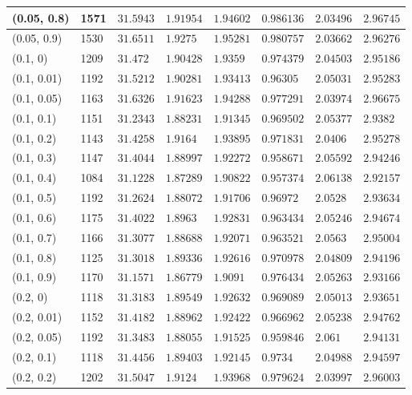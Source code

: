 \begin{center}
{\begin{longtable}{| l | p{} |  p{} | p{} | p{} | p{} | p{} | p{} |}
 (0.05, 0.8) & 1571  & $31.5943$ & $1.91954$ & $1.94602$ & $0.986136$ & $2.03496$ & $2.96745$ \\ \hline
 (0.05, 0.9) & 1530  & $31.6511$ & $1.9275$ & $1.95281$ & $0.980757$ & $2.03662$ & $2.96276$ \\ \hline
 (0.1, 0) & 1209  & $31.472$ & $1.90428$ & $1.9359$ & $0.974379$ & $2.04503$ & $2.95186$ \\ \hline
 (0.1, 0.01) & 1192  & $31.5212$ & $1.90281$ & $1.93413$ & $0.96305$ & $2.05031$ & $2.95283$ \\ \hline
 (0.1, 0.05) & 1163  & $31.6326$ & $1.91623$ & $1.94288$ & $0.977291$ & $2.03974$ & $2.96675$ \\ \hline
 (0.1, 0.1) & 1151  & $31.2343$ & $1.88231$ & $1.91345$ & $0.969502$ & $2.05377$ & $2.9382$ \\ \hline
 (0.1, 0.2) & 1143  & $31.4258$ & $1.9164$ & $1.93895$ & $0.971831$ & $2.0406$ & $2.95278$ \\ \hline
 (0.1, 0.3) & 1147  & $31.4044$ & $1.88997$ & $1.92272$ & $0.958671$ & $2.05592$ & $2.94246$ \\ \hline
 (0.1, 0.4) & 1084  & $31.1228$ & $1.87289$ & $1.90822$ & $0.957374$ & $2.06138$ & $2.92157$ \\ \hline
 (0.1, 0.5) & 1192  & $31.2624$ & $1.88072$ & $1.91706$ & $0.96972$ & $2.0528$ & $2.93634$ \\ \hline
 (0.1, 0.6) & 1175  & $31.4022$ & $1.8963$ & $1.92831$ & $0.963434$ & $2.05246$ & $2.94674$ \\ \hline
 (0.1, 0.7) & 1166  & $31.3077$ & $1.88688$ & $1.92071$ & $0.963521$ & $2.0563$ & $2.95004$ \\ \hline
 (0.1, 0.8) & 1125  & $31.3018$ & $1.89336$ & $1.92616$ & $0.970978$ & $2.04809$ & $2.94196$ \\ \hline
 (0.1, 0.9) & 1170  & $31.1571$ & $1.86779$ & $1.9091$ & $0.976434$ & $2.05263$ & $2.93166$ \\ \hline
 (0.2, 0) & 1118  & $31.3183$ & $1.89549$ & $1.92632$ & $0.969089$ & $2.05013$ & $2.93651$ \\ \hline
 (0.2, 0.01) & 1152  & $31.4182$ & $1.88962$ & $1.92422$ & $0.966962$ & $2.05238$ & $2.94762$ \\ \hline
 (0.2, 0.05) & 1192  & $31.3483$ & $1.88055$ & $1.91525$ & $0.959846$ & $2.061$ & $2.94131$ \\ \hline
 (0.2, 0.1) & 1118  & $31.4456$ & $1.89403$ & $1.92145$ & $0.9734$ & $2.04988$ & $2.94597$ \\ \hline
 (0.2, 0.2) & 1202  & $31.5047$ & $1.9124$ & $1.93968$ & $0.979624$ & $2.03997$ & $2.96003$ \\ \hline

\end{longtable}}
\end{center}
